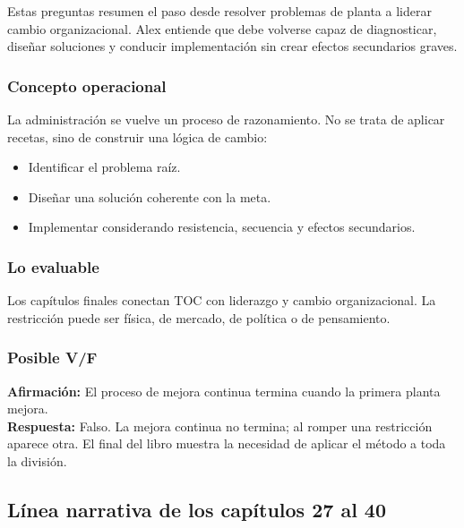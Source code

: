 \documentclass[
  11pt,
]{article}
\providecommand{\tightlist}{%
  \setlength{\itemsep}{0pt}\setlength{\parskip}{0pt}}
\begin{document}
Estas preguntas resumen el paso desde resolver problemas de planta a
liderar cambio organizacional. Alex entiende que debe volverse capaz de
diagnosticar, diseñar soluciones y conducir implementación sin crear
efectos secundarios graves.

\hypertarget{concepto-operacional-13}{%
\subsubsection{Concepto operacional}\label{concepto-operacional-13}}

La administración se vuelve un proceso de razonamiento. No se trata de
aplicar recetas, sino de construir una lógica de cambio:

\begin{itemize}
\tightlist
\item
  Identificar el problema raíz.
\item
  Diseñar una solución coherente con la meta.
\item
  Implementar considerando resistencia, secuencia y efectos secundarios.
\end{itemize}

\hypertarget{lo-evaluable-13}{%
\subsubsection{Lo evaluable}\label{lo-evaluable-13}}

Los capítulos finales conectan TOC con liderazgo y cambio
organizacional. La restricción puede ser física, de mercado, de política
o de pensamiento.

\hypertarget{posible-vf-13}{%
\subsubsection{Posible V/F}\label{posible-vf-13}}

\textbf{Afirmación:} El proceso de mejora continua termina cuando la
primera planta mejora.\\
\textbf{Respuesta:} Falso. La mejora continua no termina; al romper una
restricción aparece otra. El final del libro muestra la necesidad de
aplicar el método a toda la división.

\hypertarget{luxednea-narrativa-de-los-capuxedtulos-27-al-40}{%
\subsection{Línea narrativa de los capítulos 27 al
40}\label{luxednea-narrativa-de-los-capuxedtulos-27-al-40}}
\end{document}
